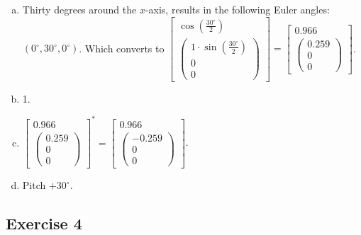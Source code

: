 \documentclass[11pt]{article}
\begin{document}
\begin{enumerate}[a.]
	\item Thirty degrees around the $x$-axis, results in the following Euler angles: $(0^\circ,30^\circ,0^\circ)$. Which converts to 
	$\begin{bmatrix}
		\cos(\frac{30^\circ}{2}) \\
		\begin{pmatrix}
			1\cdot\sin(\frac{30^\circ}{2}) \\
			0 \\
			0
		\end{pmatrix}
	\end{bmatrix}=\begin{bmatrix}
		0.966 \\
		\begin{pmatrix}
			0.259 \\
			0 \\
			0
		\end{pmatrix}
	\end{bmatrix}$.
	\item 1.
	\item $\begin{bmatrix}
		0.966 \\
		\begin{pmatrix}
			0.259 \\
			0 \\
			0
		\end{pmatrix}
	\end{bmatrix}^*=\begin{bmatrix}
		0.966 \\
		\begin{pmatrix}
			-0.259 \\
			0 \\
			0
		\end{pmatrix}
	\end{bmatrix}$.
	\item Pitch $+30^\circ$.
\end{enumerate}

\subsection{Exercise 4}
\end{document}
